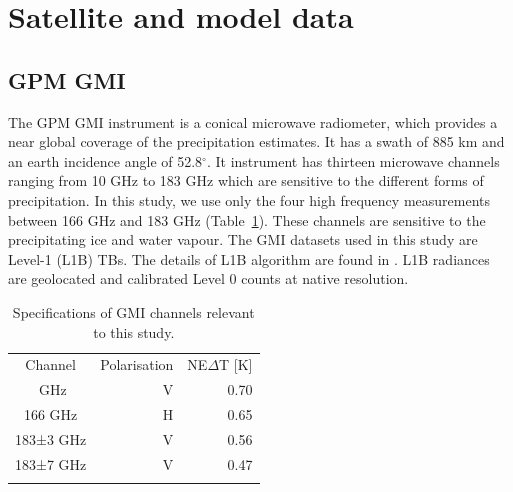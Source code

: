 \documentclass[amt, manuscript]{copernicus}
\begin{document}
\section{Satellite and model data}
\label{sec:data}
\subsection{GPM GMI}

The GPM GMI instrument is a conical microwave radiometer, which provides a near global coverage of the precipitation estimates. It has a swath of 885\,\,km  and an earth incidence angle of 52.8$^{\circ}$. It instrument has thirteen microwave channels ranging from 10\,\,GHz to 183\,\,GHz which are sensitive to the different forms of precipitation. In this study, we use only the four high frequency measurements between 166 GHz and 183 GHz (Table~\ref{tab:gmi_channels}). These channels are sensitive to the precipitating ice and water vapour. The GMI datasets used in this study are Level-1 (L1B) TBs. The details of L1B algorithm are found in \citet{}. L1B radiances are geolocated and calibrated Level 0 counts at native resolution. 

\begin{table}[t]
	\caption{Specifications of GMI channels relevant to this study.}
	\label{tab:gmi_channels}	
	\begin{tabular}{crr}
		\tophline
		Channel  & Polarisation 	& NE$\Delta$T  [K]\\
		\middlehline
			166\,\,GHz  		  & V		& 0.70	\\
			166\,\,GHz   		  & H 		& 0.65 \\
			183±3\,\,GHz         & V 	    & 0.56 \\
		    183±7\,\,GHz         & V 		& 0.47 \\
		\bottomhline
	\end{tabular}
\end{table}



\end{document}
